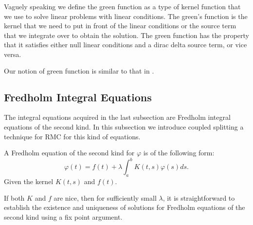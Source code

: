 \documentclass[a4paper,12pt]{article}
\begin{document}
\begin{definition}
    Vaguely speaking we define the green function as a type of kernel function that we use
    to solve linear problems with linear conditions. The green's function is the kernel that
    we need to put in front of  the linear conditions or the source term that we integrate
    over to obtain the solution.  The green function has the property that it satisfies
    either null linear conditions and a dirac delta source term, or vice versa.
\end{definition}

\begin{related}
    Our notion of green function is similar to that in \cite{hwang_simulationtabulation_2001}.
\end{related}


\subsection{Fredholm Integral Equations}

The integral equations acquired in the last subsection are Fredholm integral equations
of the second kind. In this subsection we introduce coupled splitting a technique for
RMC for this kind of equations.


\begin{definition}
    A Fredholm equation of the second kind for $\varphi$  is of the following form:
    \begin{equation}
        \varphi(t)=f(t)+\lambda \int_a^b K(t, s) \varphi(s) ds.
    \end{equation}
    Given the kernel  $K(t, s)$  and  $ f(t)$.
\end{definition}

If both $K$ and $f$ are nice, then for sufficiently small $\lambda$,
it is straightforward to establish the existence and uniqueness of solutions
for Fredholm equations of the second kind using a fix point argument.

\end{document}
